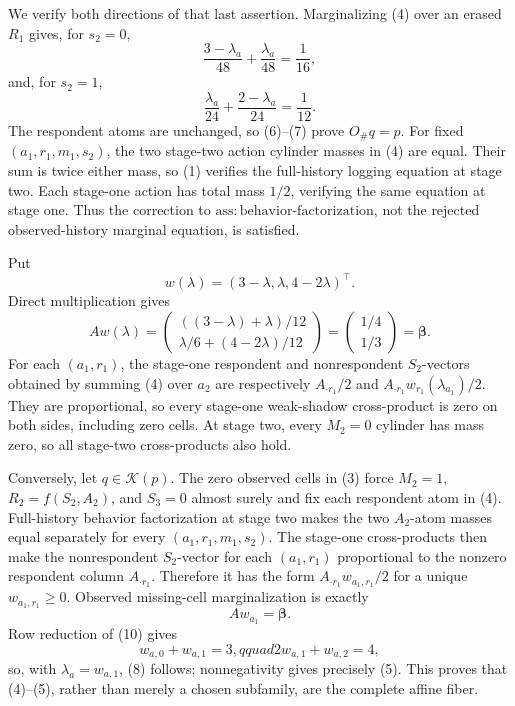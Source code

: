 We verify both directions of that last assertion. Marginalizing (4) over an erased \(R_1\) gives, for \(s_2=0\),
\[
\frac{3-\lambda_a}{48}+\frac{\lambda_a}{48}=\frac1{16},
\tag{6}
\]
and, for \(s_2=1\),
\[
\frac{\lambda_a}{24}+\frac{2-\lambda_a}{24}=\frac1{12}.
\tag{7}
\]
The respondent atoms are unchanged, so (6)--(7) prove \(O_\#q=p\). For fixed \((a_1,r_1,m_1,s_2)\), the two stage-two action cylinder masses in (4) are equal. Their sum is twice either mass, so (1) verifies the full-history logging equation at stage two. Each stage-one action has total mass \(1/2\), verifying the same equation at stage one. Thus the correction to \(\mathrm{ass{:}behavior\text{-}factorization}\), not the rejected observed-history marginal equation, is satisfied.

Put
\[
w(\lambda)=(3-\lambda,\lambda,4-2\lambda)^\top.
\tag{8}
\]
Direct multiplication gives
\[
Aw(\lambda)=\begin{pmatrix}
((3-\lambda)+\lambda)/12\\
\lambda/6+(4-2\lambda)/12
\end{pmatrix}
=\begin{pmatrix}1/4\\1/3\end{pmatrix}=\boldsymbol\beta.
\tag{9}
\]
For each \((a_1,r_1)\), the stage-one respondent and nonrespondent \(S_2\)-vectors obtained by summing (4) over \(a_2\) are respectively \(A_{\cdot r_1}/2\) and \(A_{\cdot r_1}w_{r_1}(\lambda_{a_1})/2\). They are proportional, so every stage-one weak-shadow cross-product is zero on both sides, including zero cells. At stage two, every \(M_2=0\) cylinder has mass zero, so all stage-two cross-products also hold.

Conversely, let \(q\in\mathcal K(p)\). The zero observed cells in (3) force \(M_2=1\), \(R_2=f(S_2,A_2)\), and \(S_3=0\) almost surely and fix each respondent atom in (4). Full-history behavior factorization at stage two makes the two \(A_2\)-atom masses equal separately for every \((a_1,r_1,m_1,s_2)\). The stage-one cross-products then make the nonrespondent \(S_2\)-vector for each \((a_1,r_1)\) proportional to the nonzero respondent column \(A_{\cdot r_1}\). Therefore it has the form \(A_{\cdot r_1}w_{a_1,r_1}/2\) for a unique \(w_{a_1,r_1}\geq0\). Observed missing-cell marginalization is exactly
\[
Aw_{a_1}=\boldsymbol\beta.
\tag{10}
\]
Row reduction of (10) gives
\[
w_{a,0}+w_{a,1}=3,qquad 2w_{a,1}+w_{a,2}=4,
\tag{11}
\]
so, with \(\lambda_a=w_{a,1}\), (8) follows; nonnegativity gives precisely (5). This proves that (4)--(5), rather than merely a chosen subfamily, are the complete affine fiber.

